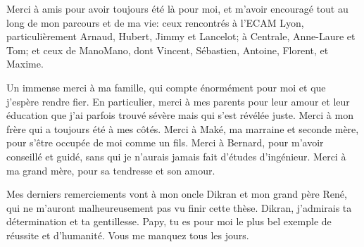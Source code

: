 Merci à amis pour avoir toujours été là pour moi, et m'avoir encouragé tout
au long de mon parcours et de ma vie: ceux rencontrés à l'ECAM Lyon,
particulièrement Arnaud, Hubert, Jimmy et Lancelot; à Centrale, Anne-Laure et
Tom; et ceux de ManoMano, dont Vincent, Sébastien, Antoine, Florent, et Maxime.

Un immense merci à ma famille, qui compte énormément pour moi et que j'espère
rendre fier. En particulier, merci à mes parents pour leur amour et leur
éducation que j'ai parfois trouvé sévère mais qui s'est révélée juste. Merci à
mon frère qui a toujours été à mes côtés. Merci à Maké, ma marraine et seconde
mère, pour s'être occupée de moi comme un fils. Merci à Bernard, pour m'avoir
conseillé et guidé, sans qui je n'aurais jamais fait d'études d'ingénieur. Merci
à ma grand mère, pour sa tendresse et son amour.

Mes derniers remerciements vont à mon oncle Dikran et mon grand père René, qui
ne m'auront malheureusement pas vu finir cette thèse. Dikran, j'admirais ta
détermination et ta gentillesse. Papy, tu es pour moi le plus bel exemple de
réussite et d'humanité. Vous me manquez tous les jours.
